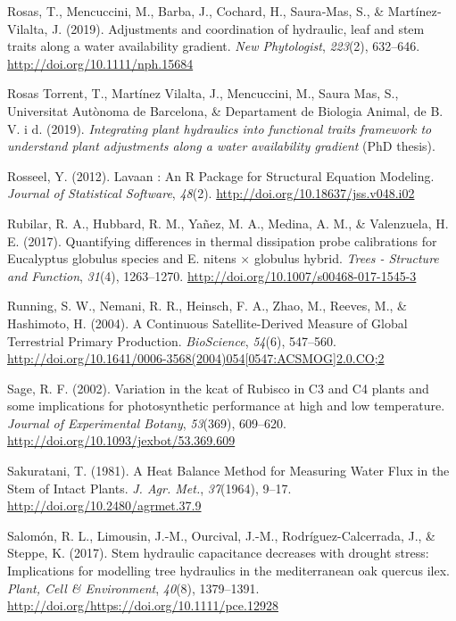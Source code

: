 \documentclass[11pt,twoside]{reedthesis}
\begin{document}
\hypertarget{ref-rosas_adjustments_2019}{}
Rosas, T., Mencuccini, M., Barba, J., Cochard, H., Saura‐Mas, S., \&
Martínez‐Vilalta, J. (2019). Adjustments and coordination of hydraulic,
leaf and stem traits along a water availability gradient. \emph{New
Phytologist}, \emph{223}(2), 632--646.
\url{http://doi.org/10.1111/nph.15684}

\hypertarget{ref-rosas_torrent_integrating_2019}{}
Rosas Torrent, T., Martínez Vilalta, J., Mencuccini, M., Saura Mas, S.,
Universitat Autònoma de Barcelona, \& Departament de Biologia Animal, de
B. V. i d. (2019). \emph{Integrating plant hydraulics into functional
traits framework to understand plant adjustments along a water
availability gradient} (PhD thesis).

\hypertarget{ref-rosseel_lavaan_2012}{}
Rosseel, Y. (2012). Lavaan : An R Package for Structural Equation
Modeling. \emph{Journal of Statistical Software}, \emph{48}(2).
\url{http://doi.org/10.18637/jss.v048.i02}

\hypertarget{ref-Rubilar2017}{}
Rubilar, R. A., Hubbard, R. M., Yañez, M. A., Medina, A. M., \&
Valenzuela, H. E. (2017). Quantifying differences in thermal dissipation
probe calibrations for Eucalyptus globulus species and E. nitens ×
globulus hybrid. \emph{Trees - Structure and Function}, \emph{31}(4),
1263--1270. \url{http://doi.org/10.1007/s00468-017-1545-3}

\hypertarget{ref-Running2004}{}
Running, S. W., Nemani, R. R., Heinsch, F. A., Zhao, M., Reeves, M., \&
Hashimoto, H. (2004). A Continuous Satellite-Derived Measure of Global
Terrestrial Primary Production. \emph{BioScience}, \emph{54}(6),
547--560.
\href{http://doi.org/10.1641/0006-3568(2004)054\%5B0547:ACSMOG\%5D2.0.CO;2}{http://doi.org/10.1641/0006-3568(2004)054{[}0547:ACSMOG{]}2.0.CO;2}

\hypertarget{ref-Sage2002}{}
Sage, R. F. (2002). Variation in the kcat of Rubisco in C3 and C4 plants
and some implications for photosynthetic performance at high and low
temperature. \emph{Journal of Experimental Botany}, \emph{53}(369),
609--620. \url{http://doi.org/10.1093/jexbot/53.369.609}

\hypertarget{ref-Sakuratani1981}{}
Sakuratani, T. (1981). A Heat Balance Method for Measuring Water Flux in
the Stem of Intact Plants. \emph{J. Agr. Met.}, \emph{37}(1964), 9--17.
\url{http://doi.org/10.2480/agrmet.37.9}

\hypertarget{ref-Salomon2017}{}
Salomón, R. L., Limousin, J.-M., Ourcival, J.-M., Rodríguez-Calcerrada,
J., \& Steppe, K. (2017). Stem hydraulic capacitance decreases with
drought stress: Implications for modelling tree hydraulics in the
mediterranean oak quercus ilex. \emph{Plant, Cell \& Environment},
\emph{40}(8), 1379--1391.
\url{http://doi.org/https://doi.org/10.1111/pce.12928}
\end{document}
